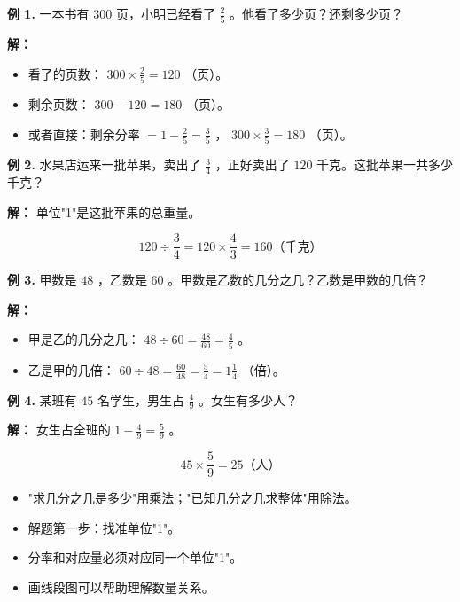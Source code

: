 \begin{workedexamples}


\textbf{例 1.} 一本书有 $300$ 页，小明已经看了 $\frac{2}{5}$ 。他看了多少页？还剩多少页？

\textbf{解：}
\begin{itemize}
  \item 看了的页数： $300 \times \frac{2}{5} = 120$ （页）。
  \item 剩余页数： $300 - 120 = 180$ （页）。
  \item 或者直接：剩余分率 $= 1 - \frac{2}{5} = \frac{3}{5}$ ， $300 \times \frac{3}{5} = 180$ （页）。
\end{itemize}


\textbf{例 2.} 水果店运来一批苹果，卖出了 $\frac{3}{4}$ ，正好卖出了 $120$ 千克。这批苹果一共多少千克？

\textbf{解：} 单位"1"是这批苹果的总重量。

\[
120 \div \frac{3}{4} = 120 \times \frac{4}{3} = 160 \text{（千克）}
\]


\textbf{例 3.} 甲数是 $48$ ，乙数是 $60$ 。甲数是乙数的几分之几？乙数是甲数的几倍？

\textbf{解：}
\begin{itemize}
  \item 甲是乙的几分之几： $48 \div 60 = \frac{48}{60} = \frac{4}{5}$ 。
  \item 乙是甲的几倍： $60 \div 48 = \frac{60}{48} = \frac{5}{4} = 1\frac{1}{4}$ （倍）。
\end{itemize}


\textbf{例 4.} 某班有 $45$ 名学生，男生占 $\frac{4}{9}$ 。女生有多少人？

\textbf{解：} 女生占全班的 $1 - \frac{4}{9} = \frac{5}{9}$ 。

\[
45 \times \frac{5}{9} = 25 \text{（人）}
\]


\end{workedexamples}

\begin{keytakeaway}


\begin{itemize}
  \item "求几分之几是多少"用乘法；"已知几分之几求整体"用除法。
  \item 解题第一步：找准单位"1"。
  \item 分率和对应量必须对应同一个单位"1"。
  \item 画线段图可以帮助理解数量关系。
\end{itemize}


\end{keytakeaway}

